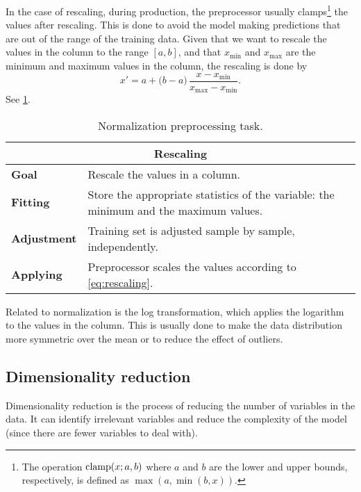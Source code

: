 In the case of rescaling, during production, the preprocessor usually clamps\footnote{The
operation $\operatorname{clamp}(x; a, b)$ where $a$ and $b$ are the lower and upper bounds,
respectively, is defined as $\max(a, \min(b, x))$.} the values after rescaling.  This is
done to avoid the model making predictions that are out of the range of the training
data.  Given that we want to rescale the values in the column to the range $[a, b]$, and
that $x_\text{min}$ and $x_\text{max}$ are the minimum and maximum values in the column,
the rescaling is done by
\begin{equation}
  \label{eq:rescaling}
  x' = a + \big(b - a\big) \, \frac{x - x_\text{min}}{x_\text{max} - x_\text{min}}\text{.}
\end{equation}
See \cref{tab:rescaling}.

\begin{table}\caption{Normalization preprocessing task.}
  \centering
  \begin{tabular}{lp{6cm}}
    \toprule
    \multicolumn{2}{c}{\textbf{Rescaling}} \\
    \midrule
    \textbf{Goal} &
      Rescale the values in a column. \\
    \textbf{Fitting} &
      Store the appropriate statistics of the variable: the minimum and the maximum
      values. \\
    \textbf{Adjustment} &
      Training set is adjusted sample by sample, independently. \\
    \textbf{Applying} &
      Preprocessor scales the values according to \cref{eq:rescaling}. \\
    \bottomrule
  \end{tabular}
  \label{tab:rescaling}
\end{table}

Related to normalization is the log transformation, which applies the logarithm to the
values in the column.  This is usually done to make the data distribution more symmetric
over the mean or to reduce the effect of outliers.


\subsection{Dimensionality reduction}

Dimensionality reduction is the process of reducing the number of variables in the data.
It can identify irrelevant variables and reduce the complexity of the model (since there
are fewer variables to deal with).

